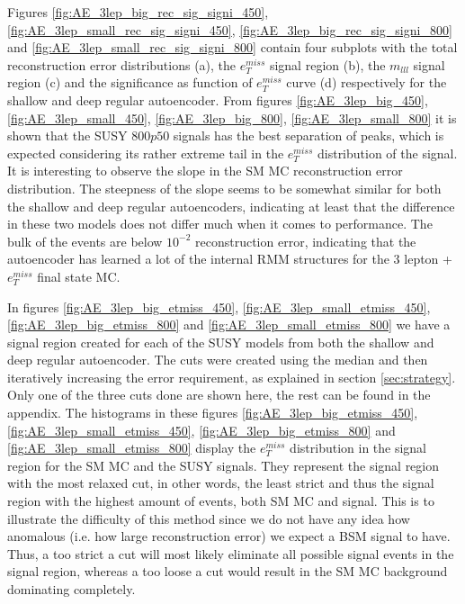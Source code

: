 Figures \ref{fig:AE_3lep_big_rec_sig_signi_450}, \ref{fig:AE_3lep_small_rec_sig_signi_450}, 
\ref{fig:AE_3lep_big_rec_sig_signi_800} and \ref{fig:AE_3lep_small_rec_sig_signi_800} contain four 
subplots with the total reconstruction error distributions (a), the $e_T^{miss}$ signal region (b), 
the $m_{lll}$ signal region (c) and the significance as function of $e_T^{miss}$ curve (d) respectively 
for the shallow and deep regular autoencoder. From figures \ref{fig:AE_3lep_big_450}, 
\ref{fig:AE_3lep_small_450}, \ref{fig:AE_3lep_big_800}, \ref{fig:AE_3lep_small_800} it is shown that the 
SUSY $800p50$ signals has the best separation of peaks, which is expected considering its 
rather extreme tail in the $e_T^{miss}$ distribution of the signal. It is interesting to 
observe the slope in the SM MC reconstruction error distribution. The steepness of the 
slope seems to be somewhat similar for both the shallow and deep regular autoencoders, indicating 
at least that the difference in these two models does not differ much when it comes to performance. 
The bulk of the events are below $10^{-2}$ reconstruction error, indicating that the autoencoder 
has learned a lot of the internal RMM structures for the 3 lepton + $e_T^{miss}$ final state MC. \par
In figures \ref{fig:AE_3lep_big_etmiss_450}, \ref{fig:AE_3lep_small_etmiss_450}, 
\ref{fig:AE_3lep_big_etmiss_800} and  \ref{fig:AE_3lep_small_etmiss_800} we have a signal region 
created for each of the SUSY models from both the shallow and deep regular autoencoder. The cuts 
were created using the median and then iteratively increasing the error requirement, as 
explained in section \ref{sec:strategy}. Only one of the three cuts done are shown here, the 
rest can be found in the appendix. The histograms in these figures \ref{fig:AE_3lep_big_etmiss_450}, 
\ref{fig:AE_3lep_small_etmiss_450}, \ref{fig:AE_3lep_big_etmiss_800} and  
\ref{fig:AE_3lep_small_etmiss_800} display the $e_T^{miss}$ distribution in the signal region 
for the SM MC and the SUSY signals. They represent the signal region with the most relaxed cut, 
in other words, the least strict and thus the signal region with the highest amount of events, 
both SM MC and signal. This is to illustrate the difficulty of this method since we do not have 
any idea how anomalous (i.e. how large reconstruction error) we expect a BSM signal to have. 
Thus, a too strict a cut will most likely eliminate all possible 
signal events in the signal region, whereas a too loose a cut would result in the SM MC background dominating completely. \par
